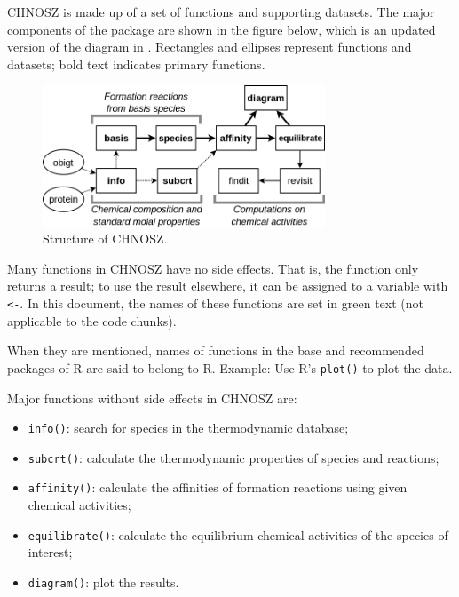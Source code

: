 \documentclass[]{tufte-handout}
\providecommand{\tightlist}{%
  \setlength{\itemsep}{0pt}\setlength{\parskip}{0pt}}
\begin{document}
CHNOSZ is made up of a set of functions and supporting datasets. The
major components of the package are shown in the figure below, which is
an updated version of the diagram in \citet{Dic08}. Rectangles and
ellipses represent functions and datasets; bold text indicates primary
functions.

\begin{figure}
\centering
\includegraphics[width=0.75000\textwidth]{CHNOSZ.png}
\caption{Structure of CHNOSZ.}
\end{figure}

Many functions in CHNOSZ have no side effects. That is, the function
only returns a result; to use the result elsewhere, it can be assigned
to a variable with \texttt{\textless{}-}. In this document, the names of
these functions are set in {green text} (not applicable to the code
chunks).

\begin{marginfigure}
When they are mentioned, names of functions in the base and recommended
packages of R are said to belong to R. Example: Use R's \texttt{plot()}
to plot the data.
\end{marginfigure}

Major functions without side effects in CHNOSZ are:

\begin{itemize}
\tightlist
\item
  {\texttt{info()}}: search for species in the thermodynamic database;
\item
  {\texttt{subcrt()}}: calculate the thermodynamic properties of species
  and reactions;
\item
  {\texttt{affinity()}}: calculate the affinities of formation reactions
  using given chemical activities;
\item
  {\texttt{equilibrate()}}: calculate the equilibrium chemical
  activities of the species of interest;
\item
  {\texttt{diagram()}}: plot the results.
\end{itemize}
\end{document}
